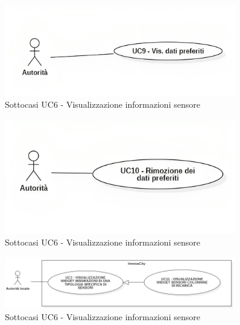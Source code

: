 
\begin{figure}[H]
    \centering
    \includegraphics[width=0.9\textwidth]{../Images/uc9.png}
    \caption{Sottocasi UC6 - Visualizzazione informazioni sensore}
    \label{fig:UC6_sub}
\end{figure}


\begin{figure}[H]
    \centering
    \includegraphics[width=0.9\textwidth]{../Images/uc10.png}
    \caption{Sottocasi UC6 - Visualizzazione informazioni sensore}
    \label{fig:UC6_sub}
\end{figure}


\begin{figure}[H]
    \centering
    \includegraphics[width=0.9\textwidth]{../Images/uc11.PNG}
    \caption{Sottocasi UC6 - Visualizzazione informazioni sensore}
    \label{fig:UC6_sub}
\end{figure}


